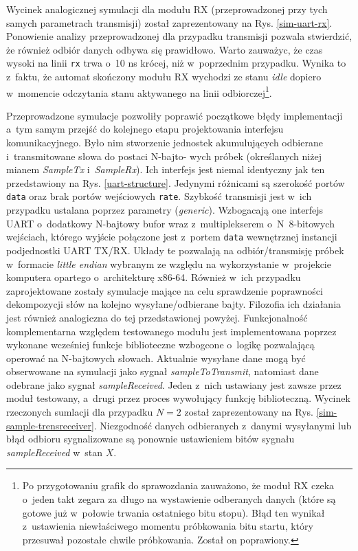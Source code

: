 Wycinek analogicznej symulacji dla modułu RX (przeprowadzonej przy tych samych parametrach transmisji) został zaprezentowany na Rys. \ref{sim-uart-rx}. Ponowienie analizy przeprowadzonej dla przypadku transmisji pozwala stwierdzić, że również odbiór danych odbywa się prawidłowo. Warto zauważyc, że czas wysoki na linii \verb|rx| trwa o~10 ns krócej, niż w~poprzednim przypadku. Wynika to z~faktu, że automat skończony modułu RX wychodzi ze stanu \textit{idle} dopiero w~momencie odczytania stanu aktywanego na linii odbiorczej\footnote{Po przygotowaniu grafik do sprawozdania zauważono, że moduł RX czeka o~jeden takt zegara za długo na wystawienie odberanych danych (które są gotowe już w~połowie trwania ostatniego bitu stopu). Błąd ten wynikał z~ustawienia niewłaściwego momentu próbkowania bitu startu, który przesuwał pozostałe chwile próbkowania. Został on poprawiony.}.

Przeprowadzone symulacje pozwoliły poprawić początkowe błędy implementacji a~tym samym przejść do kolejnego etapu projektowania interfejsu komunikacyjnego. Było nim stworzenie jednostek akumulujących odbierane i~transmitowane słowa do postaci N-bajto- wych próbek (określanych niżej mianem \textit{SampleTx} i~\textit{SampleRx}). Ich interfejs jest niemal identyczny jak ten przedstawiony na Rys. \ref{uart-structure}. Jedynymi różnicami są szerokość portów \verb|data| oraz brak portów wejściowych \verb|rate|. Szybkość transmisji jest w~ich przypadku ustalana poprzez parametry (\textit{generic}). Wzbogacają one interfejs UART o~dodatkowy N-bajtowy bufor wraz z~multiplekserem o~N~8-bitowych wejściach, którego wyjście połączone jest z~portem \verb|data| wewnętrznej instancji podjednostki UART TX/RX. Układy te pozwalają na odbiór/transmisję próbek w~formacie \textit{little endian} wybranym ze względu na wykorzystanie w~projekcie komputera opartego o~architekturę x86-64. Również w~ich przypadku zaprojektowane zostały symulacje mające na celu sprawdzenie poprawności dekompozycji słów na kolejno wysyłane/odbierane bajty. Filozofia ich działania jest również analogiczna do tej przedstawionej powyżej. Funkcjonalność komplementarna względem testowanego modułu jest implementowana poprzez wykonane wcześniej funkcje biblioteczne wzbogcone o~logikę pozwalającą operować na N-bajtowych słowach. Aktualnie wysyłane dane mogą być obserwowane na symulacji jako sygnał \textit{sampleToTransmit}, natomiast dane odebrane jako sygnał \textit{sampleReceived}. Jeden z~nich ustawiany jest zawsze przez moduł testowany, a~drugi przez proces wywołujący funkcję biblioteczną. Wycinek rzeczonych sumlacji dla przypadku $N=2$ został zaprezentowany na Rys. \ref{sim-sample-trensreceiver}. Niezgodność danych odbieranych z~danymi wysyłanymi lub błąd odbioru sygnalizowane są ponownie ustawieniem bitów sygnału \textit{sampleReceived} w~stan $X$.

